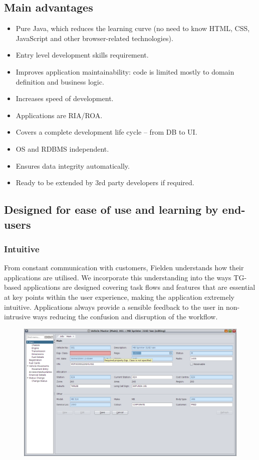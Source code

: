 \documentclass[a4paper,10pt,twocolumn]{article}
\begin{document}
\subsection*{Main advantages}
  \begin{itemize}
    \item Pure Java, which reduces the learning curve (no need to know HTML, CSS, JavaScript and other browser-related technologies).
    \item Entry level development skills requirement.
    \item Improves application maintainability: code is limited mostly to domain definition and business logic.
    \item Increases speed of development.
    \item Applications are RIA/ROA.
    \item Covers a complete development life cycle -- from DB to UI.
    \item OS and RDBMS independent.
    \item Ensures data integrity automatically.
    \item Ready to be extended by 3rd party developers if required.
  \end{itemize}

\subsection*{Designed for ease of use and learning by end-users}
 
\subsubsection*{Intuitive}
  From constant communication with customers, Fielden understands how their applications are utilised. 
  We incorporate this understanding into the ways TG-based applications are designed covering task flows and features that are essential at key points within the user experience, making the application extremely intuitive.
  Applications always provide a sensible feedback to the user in non-intrusive ways reducing the confusion and disruption of the workflow.
  \begin{figure}[!h]
  \centering
  \includegraphics[scale=0.17]{images/04-veh-master-main-error.png}
  \end{figure}
\end{document}
